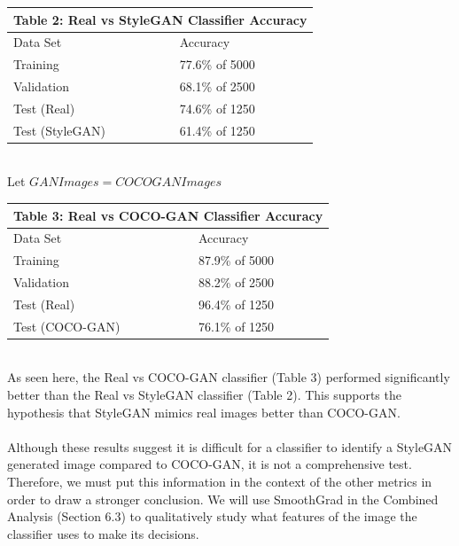 \documentclass[10pt]{article}
\begin{document}
\begin{multicols*}{2}
        \begin{tabular}{ |p{4cm}|p{4.2cm}|  }
             \hline
             \multicolumn{2}{|c|}{Table 2: \textbf{Real vs StyleGAN Classifier Accuracy}} \\
             \hline
            Data Set     & Accuracy\\
             \hline
            Training        & 77.6\% of 5000 \\
             \hline
            Validation      & 68.1\% of 2500 \\
             \hline
            Test (Real)     & 74.6\% of 1250 \\
             \hline
            Test (StyleGAN) & 61.4\% of 1250  \\
             \hline
        \end{tabular}\\
        
        Let $GANImages = COCOGANImages$\\
        
        \begin{tabular}{ |p{4cm}|p{3cm}|  }
             \hline
             \multicolumn{2}{|c|}{Table 3: \textbf{Real vs COCO-GAN Classifier Accuracy}} \\
             \hline
            Data Set     & Accuracy\\
             \hline
            Training        & 87.9\% of 5000 \\
             \hline
            Validation      & 88.2\% of 2500 \\
             \hline
            Test (Real)     & 96.4\% of 1250 \\
             \hline
            Test (COCO-GAN) & 76.1\% of 1250 \\
             \hline
        \end{tabular}
        \\
        As seen here, the Real vs COCO-GAN classifier (Table 3) performed significantly better than the Real vs StyleGAN classifier (Table 2).
        This supports the hypothesis that StyleGAN mimics real images better than COCO-GAN.
        \\\\
        Although these results suggest it is difficult for a classifier to identify a StyleGAN generated image compared to COCO-GAN, it is not a comprehensive test.
        Therefore, we must put this information in the context of the other metrics in order to draw a stronger conclusion.
        We will use SmoothGrad\cite{smoothgrad} in the Combined Analysis (Section 6.3) to qualitatively study what features of the image the classifier uses to make its decisions.


\end{multicols*}
\end{document}
